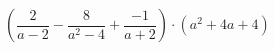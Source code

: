 \begin{ex}[type=expression]
	\begin{condition}
		\( \left( \dfrac{2}{a-2}-\dfrac{8}{a^2-4}+\dfrac{-1}{a+2} \right)\cdot(a^2+4a+4) \)
	\end{condition}
\end{ex}